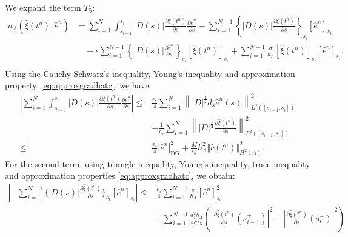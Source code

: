 \documentclass[pdflatex,sn-mathphys-num]{sn-jnl}%
\newcommand{\DG}{\mathrm{DG}}
\theoremstyle{thmstyleone}%
\theoremstyle{thmstyletwo}%
\theoremstyle{thmstylethree}%
\begin{document}
\begin{appendices}
We expand the term $T_5$:
\begin{align*}
    a_\Lambda(\hat \xi(t^{n}), \hat e^n) &= \sum_{i=1}^{N} \int_{s_{i-1}}^{s_{i}} |D(s)|\frac{\partial \hat \xi(t^{n})}{\partial s}\frac{\partial \hat e^n}{\partial s}- \sum_{i=1}^{N-1} \left\{ |D(s)|\frac{\partial \hat \xi(t^{n})}{\partial s}\right\}_{s_i} [\hat e^n]_{s_i}\\
    &\quad  -\epsilon  \sum_{i=1}^{N-1}\left\{ |D(s)|\frac{\partial \hat e^n}{\partial s}\right\}_{s_i} [\hat \xi(t^{n})]_{s_i} +\sum_{i=1}^{N-1} \frac{\sigma}{h_\Lambda}[\hat \xi(t^{n})]_{s_i} [\hat e^n]_{s_i}.\\
\end{align*}
Using the Cauchy-Schwarz's inequality, Young's inequality and approximation property~\eqref{eq:approxgradhatc}, 
we have:
\begin{align*}
    \left\vert\sum_{i=1}^{N} \int_{s_{i-1}}^{s_{i}} |D(s)|\frac{\partial \hat \xi(t^{n})}{\partial s}\frac{\partial \hat e^n}{\partial s} \right\vert 
     \leq & 
     \frac{\epsilon_5}{4}\sum_{i=1}^N \left\||D|^{\frac{1}{2}}d_s\hat e^n(s)\right\|^2_{L^2([s_{i-1},s_i])}\nonumber\\
&      +
     \frac{1}{\epsilon_5}\sum_{i=1}^N
     \left\||D|^{\frac{1}{2}}\frac{\partial \hat \xi(t^{n})}{\partial s}\right\|^2_{L^2([s_{i-1},s_i])}\\
     \leq  &\frac{\epsilon_5}{4} |\hat e^n|^2_{\DG} + \frac{M}{\epsilon_5} h^2_\Lambda \Vert\hat c(t^n)\Vert^2_{H^2(\Lambda)}.
\end{align*}
For the second term, using triangle inequality, Young's inequality, trace inequality and approximation properties \eqref{eq:approxgradhatc}, we obtain:
\begin{align*}
\left\vert - \sum_{i=1}^{N-1}\{ |D(s)|\frac{\partial \hat \xi(t^{n})}{\partial s}\}_{s_i} [\hat e^n]_{s_i} \right\vert  \leq &
\frac{\epsilon_5}{4}
\sum_{i=1}^{N-1} \frac{\sigma}{h_\Lambda}
[\hat e^n]_{s_i}^2\\
& 
+ \sum_{i=1}^{N-1} \frac{d_1^2 h_\Lambda}{4 \sigma\epsilon_5}  \left( \left\vert \frac{\partial \hat \xi(t^{n})}{\partial s}(s_{i-1}^+)\right\vert^2+
\left\vert \frac{\partial \hat \xi(t^{n})}{\partial s}(s_{i}^-)\right\vert^2\right)   
\\

\end{align*}
\end{appendices}
\end{document}
